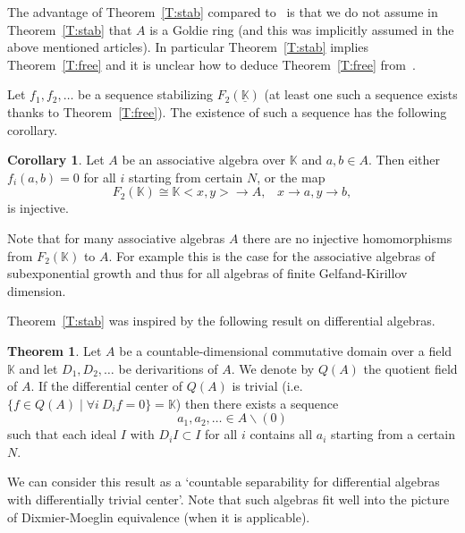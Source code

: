 \documentclass{amsart} \textwidth=18.0cm \oddsidemargin=-1cm \evensidemargin=-1cm \topmargin=-1cm \textheight=23cm
\theoremstyle{definition}
\newtheorem{theorem}{Theorem}
\newtheorem{corollary}{Corollary}
\begin{document}
The advantage of Theorem~\ref{T:stab} compared to~\cite{I, Dix2} is that we do not assume in Theorem~\ref{T:stab} that $A$ is a Goldie ring (and this was implicitly assumed in the above mentioned articles). In particular Theorem~\ref{T:stab} implies Theorem~\ref{T:free} and it is unclear how to deduce Theorem~\ref{T:free} from~\cite{I, Dix2}. 

Let $f_1, f_2,\ldots$ be a sequence stabilizing $F_2(\underline{\mathbb K})$ (at least one such a sequence exists thanks to Theorem~\ref{T:free}).
The existence of such a sequence has the following corollary.

\begin{corollary} 
Let $A$ be an associative algebra over $\mathbb K$ and $a, b\in A$. Then either $f_i(a, b)=0$ for all $i$ starting from certain $N$, or the map$$F_2(\mathbb K)\cong\mathbb K\!<\!x, y\!>\to A,\hspace{10pt}x\to a, y\to b,$$ is injective.
\end{corollary}
Note that for many associative algebras $A$ there are no injective homomorphisms from $F_2(\mathbb K)$ to $A$. 
For example this is the case for the associative algebras of subexponential growth and thus for all algebras of finite Gelfand-Kirillov dimension. 

Theorem~\ref{T:stab} was inspired by the following result on differential algebras.
\begin{theorem}\label{T:stadD}
    Let $A$ be a countable-dimensional commutative domain over a field $\mathbb K$ and let $D_1, D_2,\ldots$ be derivaritions of $A$. 
    We denote by  $Q(A)$ the quotient field of $A$. If the differential center of $Q(A)$ is trivial (i.e. $\{f\in Q(A)\mid \forall i~ D_if=0\}=\mathbb K$) then there exists a sequence $$a_1, a_2,\ldots\in A\backslash(0)$$ such that each ideal $I$ with $D_iI\subset I$ for all $i$ contains all $a_i$ starting from a certain $N$.
\end{theorem}
We can consider this result as a `countable separability for differential algebras with differentially trivial center'. Note that such algebras fit well into the picture of Dixmier-Moeglin equivalence (when it is applicable). 
\end{document}
